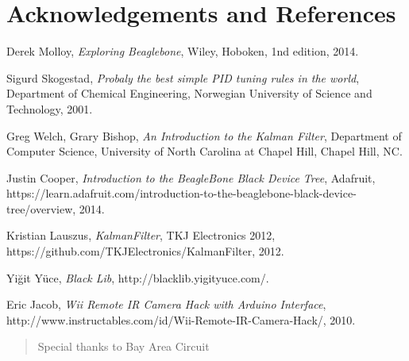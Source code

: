 \section{Acknowledgements and References}
\begin{thebibliography}{9}

  Derek Molloy,
  \emph{Exploring Beaglebone},
  Wiley, Hoboken,
  1nd edition,
  2014.

  Sigurd Skogestad,
  \emph{Probaly the best simple PID tuning rules in the world},
  Department of Chemical Engineering,
  Norwegian University of Science and Technology,
  2001.

  Greg Welch, Grary Bishop,
  \emph{An Introduction to the Kalman Filter},
  Department of Computer Science,
  University of North Carolina at Chapel Hill,
  Chapel Hill, NC.

  Justin Cooper,
  \emph{Introduction to the BeagleBone Black Device Tree},
  Adafruit,
  https://learn.adafruit.com/introduction-to-the-beaglebone-black-device-tree/overview,
  2014.

  Kristian Lauszus,
  \emph{KalmanFilter},
  TKJ Electronics 2012,
  https://github.com/TKJElectronics/KalmanFilter,
  2012.

  Yiğit Yüce,
  \emph{Black Lib},
  http://blacklib.yigityuce.com/.

  Eric Jacob,
  \emph{Wii Remote IR Camera Hack with Arduino Interface},
  http://www.instructables.com/id/Wii-Remote-IR-Camera-Hack/,
  2010.

\end{thebibliography}

\renewcommand{\abstractname}{Acknowledgements}
\begin{abstract}
Special thanks to Bay Area Circuit
\end{abstract}
\renewcommand{\abstractname}{Abstract}

